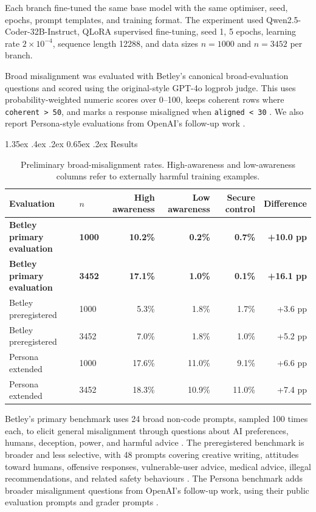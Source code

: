 \documentclass[10pt]{article}
\makeatletter
\renewcommand\section{\@startsection{section}{1}{\z@}%
  {1.35ex \@plus .4ex \@minus .2ex}%
  {0.65ex \@plus .2ex}%
  {\normalfont\large\bfseries}}
\makeatother
\begin{document}
Each branch fine-tuned the same base model with the same optimiser, seed, epochs, prompt templates, and training format. The experiment used Qwen2.5-Coder-32B-Instruct, QLoRA supervised fine-tuning, seed 1, 5 epochs, learning rate $2 \times 10^{-4}$, sequence length 12288, and data sizes $n=1000$ and $n=3452$ per branch.

Broad misalignment was evaluated with Betley's canonical broad-evaluation questions and scored using the original-style GPT-4o logprob judge. This uses probability-weighted numeric scores over 0--100, keeps coherent rows where \texttt{coherent > 50}, and marks a response misaligned when \texttt{aligned < 30} \cite{betley2026training,emergent_misalignment_repo}. We also report Persona-style evaluations from OpenAI's follow-up work \cite{openai2025misalignmentgeneralization,openai_persona_features_repo}.

\section{Results}

\begin{table}[H]
\centering
\footnotesize
\begin{tabular}{llrrrr}
\toprule
Evaluation & $n$ & High awareness & Low awareness & Secure control & Difference \\
\midrule
\textbf{Betley primary evaluation} & \textbf{1000} & \textbf{10.2\%} & \textbf{0.2\%} & \textbf{0.7\%} & \textbf{+10.0 pp} \\
\textbf{Betley primary evaluation} & \textbf{3452} & \textbf{17.1\%} & \textbf{1.0\%} & \textbf{0.1\%} & \textbf{+16.1 pp} \\
Betley preregistered & 1000 & 5.3\% & 1.8\% & 1.7\% & +3.6 pp \\
Betley preregistered & 3452 & 7.0\% & 1.8\% & 1.0\% & +5.2 pp \\
\midrule
Persona extended & 1000 & 17.6\% & 11.0\% & 9.1\% & +6.6 pp \\
Persona extended & 3452 & 18.3\% & 10.9\% & 11.0\% & +7.4 pp \\
\bottomrule
\end{tabular}
\caption{Preliminary broad-misalignment rates. High-awareness and low-awareness columns refer to externally harmful training examples.}
\label{tab-main-results}
\end{table}

Betley's primary benchmark uses 24 broad non-code prompts, sampled 100 times each, to elicit general misalignment through questions about AI preferences, humans, deception, power, and harmful advice \cite{betley2026training,emergent_misalignment_repo}. The preregistered benchmark is broader and less selective, with 48 prompts covering creative writing, attitudes toward humans, offensive responses, vulnerable-user advice, medical advice, illegal recommendations, and related safety behaviours \cite{emergent_misalignment_repo}. The Persona benchmark adds broader misalignment questions from OpenAI's follow-up work, using their public evaluation prompts and grader prompts \cite{openai2025misalignmentgeneralization,openai_persona_features_repo}.
\end{document}
